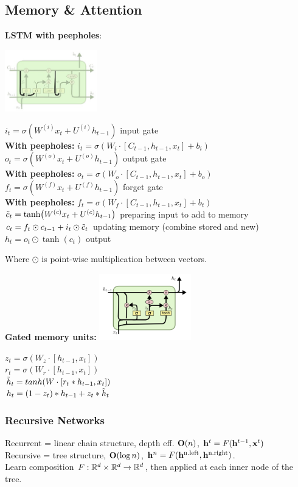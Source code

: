 \subsection{Memory \& Attention}
\label{sub:memoryandattention}
    \textbf{LSTM with peepholes}:
    
    \includegraphics[width=4cm]{images/lstm-peepholes.png}
    
    \tab $i_t=\sigma(W^{(i)}x_t+U^{(i)}h_{t-1})$ input gate\\
\textbf{With peepholes:} $i_t=\sigma(W_i\cdot [C_{t-1},h_{t-1}, x_t]+b_i)$\\
    \tab $o_t=\sigma(W^{(o)}x_t+U^{(o)}h_{t-1})$ output gate \\
\textbf{With peepholes:} $o_t=\sigma(W_o\cdot [C_{t-1},h_{t-1}, x_t]+b_o)$\\
    \tab $f_t=\sigma(W^{(f)}x_t+U^{(f)}h_{t-1})$ forget gate\\
\textbf{With peepholes:} $f_t=\sigma(W_f\cdot [C_{t-1},h_{t-1}, x_t]+b_t)$\\
    \tab $\Tilde{c}_t=\tanh(W^{(c)}x_t+U^{(c)}h_{t-1})$ preparing input to add to memory\\
    \tab $c_t=f_t\odot c_{t-1}+i_t\odot \Tilde{c}_t$ updating memory (combine stored and new)\\
    \tab $h_t=o_t\odot\tanh(c_t)$ output
    
    Where $\odot$ is point-wise multiplication between vectors.
    
    \textbf{Gated memory units:}
    \includegraphics[width=4cm]{images/gru.png}
    
    $z_t=\sigma(W_z \cdot [h_{t-1},x_t])$\\
    $r_t=\sigma(W_r \cdot [h_{t-1},x_t])$\\
    $\Tilde{h}_t=tanh(W \cdot [r_t * h_{t-1},x_t])$\\
    $h_t=(1-z_t)*h_{t-1}+z_t*\Tilde{h}_t$

    
    \subsubsection{Recursive Networks}
    \label{ssub:recursivenetworks}
    Recurrent = linear chain structure, depth eff. $\mathbf O(n)$, $\mathbf h^t=F(\mathbf h^{t-1},\mathbf x^t)$\\
    Recursive = tree structure, $\mathbf O(\log n)$, $\mathbf h^n=F(\mathbf h^\text{n.left},\mathbf h^\text{n.right})$.\\
    Learn composition $F:\mathbb R^d\times\mathbb R^d\xrightarrow{}\mathbb R^d$, then applied at each inner node of the tree.
